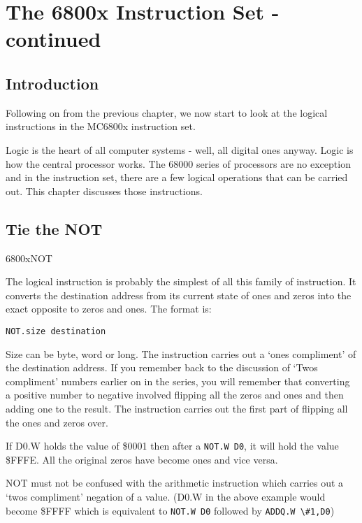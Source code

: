 
\chapter{The 6800x Instruction Set -{} continued}

\section{Introduction}
\label{ch4-intro}%

Following on from the previous chapter, we now start to look at the
    logical instructions in the MC6800x instruction set.

Logic is the heart of all computer systems -{} well, all digital ones
    anyway. Logic is how the central processor works. The 68000 series of
    processors are no exception and in the instruction set, there are a few
    logical operations that can be carried out. This chapter discusses those
    instructions.

\section{Tie the NOT}\mc6800x{NOT}
\label{ch4-Logic}%

The logical  instruction is probably the simplest of all this
    family of instruction. It converts the destination address from its
    current state of ones and zeros into the exact opposite to zeros and ones.
    The format is:

\begin{lstlisting}[firstnumber=1,]
          NOT.size destination
\end{lstlisting}

Size can be byte, word or long. The instruction carries out a `ones
    compliment' of the destination address. If you remember back to the
    discussion of `Twos compliment' numbers earlier on in the series, you will
    remember that converting a positive number to negative involved flipping
    all the zeros and ones and then adding one to the result. The 
    instruction carries out the first part of flipping all the ones and zeros
    over.

If D0.W holds the value of \$0001 then after a \lstinline{NOT.W D0}, it will hold
    the value \$FFFE. All the original zeros have become ones and vice
    versa.

NOT must not be confused with the arithmetic  instruction which
    carries out a `twos compliment' negation of a value. (D0.W in the above
    example would become \$FFFF which is equivalent to \lstinline{NOT.W D0} followed by
    \lstinline{ADDQ.W \#1,D0})

